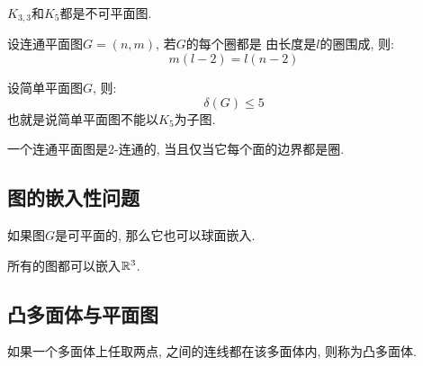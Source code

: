 \begin{theorem}[两种不可平面图]
    \(K_{3,3}\)和\(K_5\)都是不可平面图.
\end{theorem}

\begin{deduction}
    设连通平面图\(G=(n,m)\), 若\(G\)的每个圈都是
    由长度是\(l\)的圈围成, 则:
    \[m(l-2)=l(n-2)\]
\end{deduction}

\begin{deduction}
    设简单平面图\(G\), 则:
    \[\delta(G) \le 5\]
    也就是说简单平面图不能以\(K_5\)为子图.
\end{deduction}

\begin{theorem}[]
    一个连通平面图是2-连通的, 当且仅当它每个面的边界都是圈.
\end{theorem}

\subsection{图的嵌入性问题}

\begin{theorem}
    如果图\(G\)是可平面的, 那么它也可以球面嵌入.
\end{theorem}

\begin{theorem}
    所有的图都可以嵌入\(\mathbb{R}^3\).
\end{theorem}

\subsection{凸多面体与平面图}

\begin{definition}[凸多面体]
    如果一个多面体上任取两点, 之间的连线都在该多面体内,
    则称为凸多面体.
\end{definition}